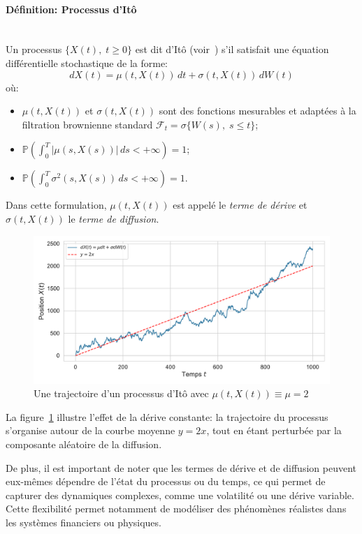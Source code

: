 \paragraph{Définition: Processus d'Itô}\mbox{}\\
Un processus $\{X(t),\;t \geq 0\}$ est dit d'Itô (voir~\cite{ito1944}) s'il satisfait une équation différentielle stochastique de la forme:
\begin{equation}
    dX(t) = \mu(t, X(t))\,dt + \sigma(t, X(t))\,dW(t)
\end{equation}\label{ito_eq}
où:
\begin{itemize}
    \item $\mu(t, X(t))$ et $\sigma(t, X(t))$ sont des fonctions mesurables et adaptées à la filtration brownienne standard $\mathcal{F}_t=\sigma\{W(s),\;s\leq t\}$;
    \item $\mathbb{P}\left( \int_0^T |\mu(s, X(s))|\,ds < +\infty \right) = 1$;
    \item $\mathbb{P}\left( \int_0^T \sigma^2(s, X(s))\,ds < +\infty \right) = 1$.
\end{itemize}
Dans cette formulation, $\mu(t, X(t))$ est appelé le \textit{terme de dérive} et $\sigma(t, X(t))$ le \textit{terme de diffusion}.
\begin{figure}[htb]
    \centering
    \includegraphics[width=0.9\linewidth]{img/intro/path_drift.pdf}
    \caption{Une trajectoire d'un processus d'Itô avec $\mu(t, X(t)) \equiv \mu = 2$}\label{fig:TrajIto}
\end{figure}
\FloatBarrier La figure~\ref{fig:TrajIto} illustre l'effet de la dérive constante: la trajectoire du processus s'organise autour de la courbe moyenne \( y = 2x \), tout en étant perturbée par la composante aléatoire de la diffusion.

De plus, il est important de noter que les termes de dérive et de diffusion peuvent eux-mêmes dépendre de l'état du processus ou du temps, ce qui permet de capturer des dynamiques complexes, comme une volatilité ou une dérive variable. Cette flexibilité permet notamment de modéliser des phénomènes réalistes dans les systèmes financiers ou physiques.

